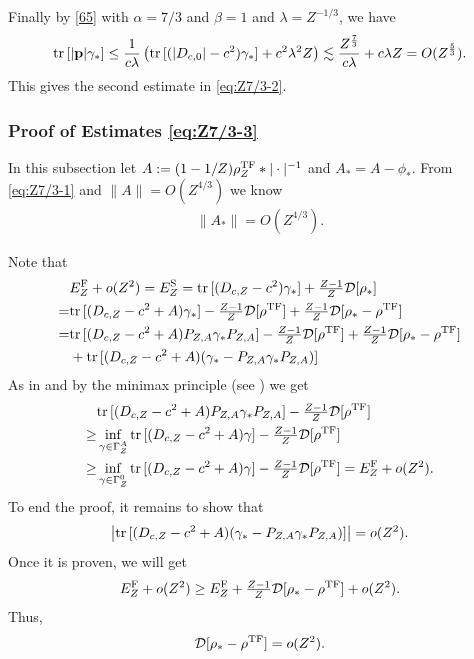 \documentclass[a4paper]{amsart}
\def\tr{{\rm tr \,}}
\def\bp{{\mathbf p}}
\def\cD{\mathcal{D}}
\begin{document}
Finally by \eqref{65} with $\alpha=7/3$ and $\beta=1$ and
$\lambda=Z^{-1/3}$, we have
\begin{equation}
    \tr[|\bp|\gamma_*]\leq \frac{1}{c\lambda}\left(\tr[(|D_{c,0}|-c^2)\gamma_*]+ c^2\lambda^2 Z\right)\lesssim \frac{ Z^{\frac73}}{c\lambda}+ c
    \lambda Z= O(Z^\frac53).
\end{equation}
This gives the second estimate in \eqref{eq:Z7/3-2}.

\subsubsection{Proof of Estimates \eqref{eq:Z7/3-3}}
In this subsection let $A:=(1-1/Z)\rho^{\rm TF}_Z*|\cdot|^{-1}$ and
$A_*=A-\phi_*$. From \eqref{eq:Z7/3-1} and $\|A\|=O(Z^{4/3})$ we know
\begin{align}\label{eq:177}
    \|A_*\|=O(Z^{4/3}).
\end{align}

Note that
\begin{equation}\label{eq:178}
\begin{split}
    &E_{Z}^{\rm F}+o(Z^2)=E^{\rm S}_Z=\tr[(D_{c,Z}-c^2) \gamma_*]+\tfrac{Z-1}{Z}\cD[\rho_*]\\
=& \tr[(D_{c,Z}-c^2+A) \gamma_*]-\tfrac{Z-1}{Z}\cD[\rho^{\rm TF}]+\tfrac{Z-1}{Z}\cD[\rho_*-\rho^{\rm TF}]\\
=&\tr[(D_{c,Z}-c^2+A) P_{Z,A}\gamma_*P_{Z,A}]-\tfrac{Z-1}{Z}\cD[\rho^{\rm TF}]+\tfrac{Z-1}{Z}\cD[\rho_*-\rho^{\rm TF}] \\
&+ \tr[(D_{c,Z}-c^2+A) (\gamma_*-P_{Z,A}\gamma_*P_{Z,A})]
\end{split}
\end{equation}
As in \cite[Section 3]{HandrekSiedentop2015} and by the minimax
principle (see \cite{GriesemerSiedentop1999,Dolbeaultetal2000O}) we get
\begin{equation}
\begin{split}
  &\tr[(D_{c,Z}-c^2+A) P_{Z,A}\gamma_*P_{Z,A}]-\tfrac{Z-1}{Z}\cD[\rho^{\rm TF}]\\
  \geq& \inf_{\gamma\in \Gamma_Z^A} \tr[(D_{c,Z}-c^2+A) \gamma]-\tfrac{Z-1}{Z}\cD[\rho^{\rm TF}]\\
   \geq& \inf_{\gamma\in \Gamma_Z^0} \tr[(D_{c,Z}-c^2+A) \gamma]-\tfrac{Z-1}{Z}\cD[\rho^{\rm TF}]
  =E_Z^{\rm F}+o(Z^2).
\end{split}
\end{equation}
To end the proof, it remains to show that
\begin{align}\label{eq:179}
  \left|\tr[(D_{c,Z}-c^2+A) (\gamma_*-P_{Z,A}\gamma_*P_{Z,A})]\right|=o(Z^2).
\end{align}
Once it is proven, we will get
\begin{align*}
  E_{Z}^{\rm F}+o(Z^2)\geq  E_{Z}^{\rm F}+ \tfrac{Z-1}{Z}\cD[\rho_*-\rho^{\rm TF}] +o(Z^2).
\end{align*}
Thus,
\begin{equation}
    \cD[\rho_*-\rho^{\rm TF}]=o(Z^2).
\end{equation}
\end{document}
